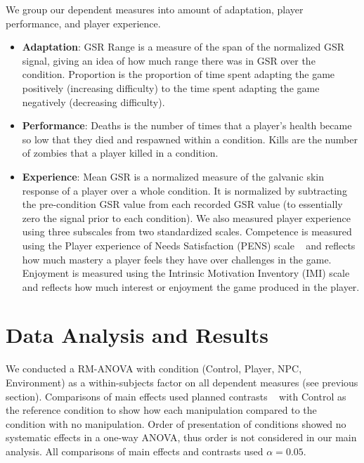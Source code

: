 We group our dependent measures into amount of adaptation, player performance, and player experience.

\begin{itemize}
	\item \textbf{Adaptation}: GSR Range is a measure of the span of the normalized GSR signal, giving an idea of how much range there was in GSR over the condition. Proportion is the proportion of time spent adapting the game positively (increasing difficulty) to the time spent adapting the game negatively (decreasing difficulty).

	\item \textbf{Performance}: Deaths is the number of times that a player's health became so low that they died and respawned within a condition. Kills are the number of zombies that a player killed in a condition.

	\item \textbf{Experience}: Mean GSR is a normalized measure of the galvanic skin response of a player over a whole condition. It is normalized by subtracting the pre-condition GSR value from each recorded GSR value (to essentially zero the signal prior to each condition). We also measured player experience using three subscales from two standardized scales. Competence is measured using the Player experience of Needs Satisfaction (PENS) scale ~\cite{ryan2006motivational} and reflects how much mastery a player feels they have over challenges in the game. Enjoyment is measured using the Intrinsic Motivation Inventory (IMI) scale ~\cite{ryan1982control} and reflects how much interest or enjoyment the game produced in the player.
\end{itemize}


\section{Data Analysis and Results}

We conducted a RM-ANOVA with condition (Control, Player, NPC, Environment) as a within-subjects factor on all dependent measures (see previous section). Comparisons of main effects used planned contrasts ~\cite{field2013discovering} with Control as the reference condition to show how each manipulation compared to the condition with no manipulation. Order of presentation of conditions showed no systematic effects in a one-way ANOVA, thus order is not considered in our main analysis. All comparisons of main effects and contrasts used $\alpha = 0.05$.

